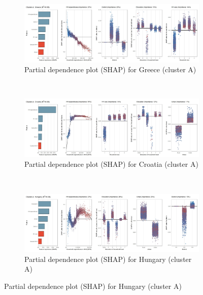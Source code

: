 \begin{figure}[ht!]\ContinuedFloat
    \centering
   \begin{subfigure}[b]{\textwidth}
   \centering
         \caption{Partial dependence plot (SHAP) for Greece (cluster A)}
         \label{fig:5b_GRC}
         \includegraphics[width=\textwidth]{Figure 5b/Figure_5b_GRC}
         \end{subfigure}
    \\
    \vspace{0.5cm}
   \begin{subfigure}[b]{\textwidth}
   \centering
         \caption{Partial dependence plot (SHAP) for Croatia (cluster A)}
         \label{fig:5b_HRV}
         \includegraphics[width=\textwidth]{Figure 5b/Figure_5b_HRV}     
     \end{subfigure}
    \\
    \vspace{0.5cm}
   \begin{subfigure}[b]{\textwidth}
     \centering
         \caption{Partial dependence plot (SHAP) for Hungary (cluster A)}
         \label{fig:5b_HUN}
         \includegraphics[width=\textwidth]{Figure 5b/Figure_5b_HUN}
    \end{subfigure}

\end{figure}
